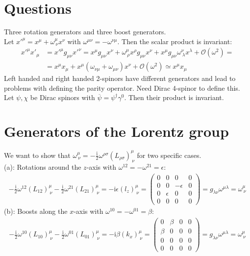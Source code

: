 \documentclass[english, parskip=full]{scrartcl}
\title{\titel}
\author{\autor}
\date{\today}
\newcommand{\kla}{}
\def\I{\text{i}}
\begin{document}
\maketitle  %

\section{Questions}
Three rotation generators and three boost generators.\\
Let $x'^\mu=x^\mu +\omega^\mu_{\ \nu}x^\nu$ with $\omega^{\mu\nu}=-\omega^{\nu\mu}$. Then the scalar product is invariant:
\begin{align*}
x'^\mu x'_\mu&=x'^\mu g_{\mu\nu}x'^\nu=x^\mu g_{\mu\nu}x^\nu +\omega^\mu_{\ \rho}x^\rho g_{\mu\nu} x^\nu + x^\mu g_{\mu\nu}\omega^\nu_{\ \lambda}x^\lambda +\mathcal{O}(\omega^2)=\\
&=x^\mu x_\mu+x^\mu \kla\left( {\omega_{\nu\mu}+\omega_{\mu\nu}} \right)x^\nu +\mathcal{O}(\omega^2)\simeq x^\mu x_\mu 
\end{align*}
Left handed and right handed 2-spinors have different generators and lead to problems with defining the parity operator. Need Dirac 4-spinor to define this.\\
Let $\psi,\chi$ be Dirac spinors with $\overline{\psi}=\psi^\dagger\gamma^0$. Then their product is invariant.
\section{Generators of the Lorentz group}
We want to show that $\omega^\mu_{\ \nu}=-\frac{\I}{2}\omega^{\rho\sigma}(L_{\rho\sigma})^\mu_{\ \nu}$ for two specific cases.\\
(a): Rotations around the $z$-axis with $\omega^{12}=-\omega^{21}=\epsilon$:
\begin{align*}
-\frac{\I}{2}\omega^{12}(L_{12})^\mu_{\ \nu}-\frac{\I}{2}\omega^{21}(L_{21})^\mu_{\ \nu}=-\I\epsilon (l_z)^\mu_{\ \nu}=\begin{pmatrix}
0&0&0&0\\ 0&0&-\epsilon&0\\ 0&\epsilon&0&0\\ 0&0&0&0
\end{pmatrix}=g_{\lambda\nu}\omega^{\mu\lambda}=\omega^\mu_{\ \nu}
\end{align*}
(b): Boosts along the $x$-axis with $\omega^{10}=-\omega^{01}=\beta$:
\begin{align*}
-\frac{\I}{2}\omega^{10}(L_{10})^\mu_{\ \nu}-\frac{\I}{2}\omega^{01}(L_{01})^\mu_{\ \nu}=-\I\beta (k_x)^\mu_{\ \nu}=\begin{pmatrix}
0&\beta&0&0\\ \beta&0&0&0\\ 0&0&0&0\\ 0&0&0&0
\end{pmatrix}=g_{\lambda\nu}\omega^{\mu\lambda}=\omega^\mu_{\ \nu}
\end{align*}
\end{document}
